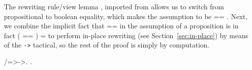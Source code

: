 \coqdocemptyline


The rewriting rule/view lemma , imported from  allows us
to switch from propositional to boolean equality, which
makes the assumption to be  == . Next, we combine the implicit
fact that  ==  in the assumption of a proposition is in fact (
== ) =  to perform in-place rewriting (see
Section~\ref{sec:in-place}) by means of the \texttt{->}\ssrtl{->}
tactical, so the rest of the proof is simply by computation.


\begin{coqdoccode}
\coqdocemptyline
\coqdocnoindent
{} /=>->.\coqdoceol
\coqdocnoindent
{}.\coqdoceol
\coqdocemptyline
\end{coqdoccode}


